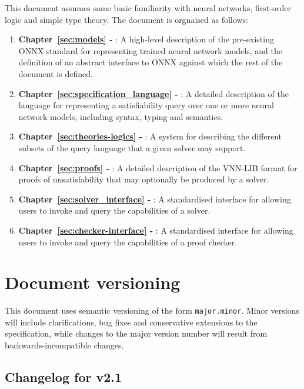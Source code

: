 This document assumes some basic familiarity with neural networks, first-order logic and simple type theory. The document is orgnaised as follows:
\begin{enumerate}
\item \textbf{Chapter~\ref{sec:models} - }: A high-level description of the pre-existing ONNX standard for representing trained neural network models, and the definition of an abstract interface to ONNX against which the rest of the document is defined.
\item \textbf{Chapter~\ref{sec:specification_language} - }: A detailed description of the \vnnlib{} language for representing a satisfiability query over one or more neural network models, including syntax, typing and semantics.
\item \textbf{Chapter~\ref{sec:theories-logics} - }: A system for describing the different subsets of the query language that a given solver may support.
\item \textbf{Chapter~\ref{sec:proofs} - }: A detailed description of the VNN-LIB format for proofs of unsatisfability that may optionally be produced by a solver.
\item \textbf{Chapter~\ref{sec:solver_interface} - }: A standardised interface for allowing users to invoke and query the capabilities of a solver.
\item \textbf{Chapter~\ref{sec:checker-interface} - }: A standardised interface for allowing users to invoke and query the capabilities of a proof checker.

\end{enumerate}

\section{Document versioning}

This document uses semantic versioning of the form \texttt{major.minor}. Minor versions will include clarifications, bug fixes and conservative extensions to the specification, while changes to the major version number will result from backwards-incompatible changes.

\subsection*{Changelog for v2.1}

